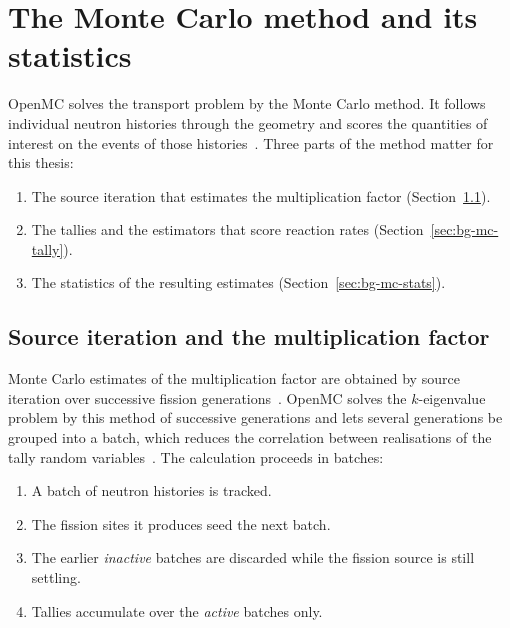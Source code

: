 \section{The Monte Carlo method and its statistics}
\label{sec:bg-mc}

OpenMC solves the transport problem by the Monte Carlo method. It follows
individual neutron histories through the geometry and scores the
quantities of interest on the events of those
histories~\cite{romano_openmc_2015}. Three parts of the method matter
for this thesis:

\begin{enumerate}
  \item The source iteration that estimates the multiplication factor
        (Section~\ref{sec:bg-mc-k}).

  \item The tallies and the estimators that score reaction rates
        (Section~\ref{sec:bg-mc-tally}).

  \item The statistics of the resulting estimates
        (Section~\ref{sec:bg-mc-stats}).
\end{enumerate}

\subsection{Source iteration and the multiplication factor}
\label{sec:bg-mc-k}

Monte Carlo estimates of the multiplication factor are obtained by source iteration over successive fission generations~\cite{lux_koblinger_1991}.
OpenMC solves the $k$-eigenvalue problem by this method of successive
generations and lets several generations be grouped into a batch, which
reduces the correlation between realisations of the tally random
variables~\cite{romano_openmc_2015}. The calculation proceeds in
batches:

\begin{enumerate}
  \item A batch of neutron histories is tracked.

  \item The fission sites it produces seed the next batch.

  \item The earlier \emph{inactive} batches are discarded while the
        fission source is still settling.

  \item Tallies accumulate over the \emph{active} batches only.
\end{enumerate}

